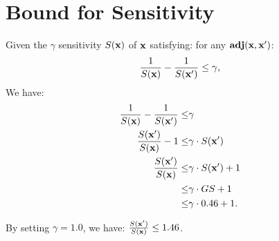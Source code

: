 \documentclass{article}
\begin{document}
\section{Bound for Sensitivity}
Given the $\gamma$ sensitivity $S(\textbf{x})$ of $\textbf{x}$ satisfying: for any $\textbf{adj}(\textbf{x},\textbf{x}')$:
\begin{equation}
\label{eq_gamma_smooth}
\frac{1}{S(\textbf{x})} - \frac{1}{S(\textbf{x}')} \leq \gamma,
\end{equation}
We have:
\begin{align*}
\frac{1}{S(\textbf{x})} - \frac{1}{S(\textbf{x}')} \leq & \gamma\\
\frac{S(\textbf{x}')}{S(\textbf{x})} - 1 \leq & \gamma \cdot S(\textbf{x}')\\
\frac{S(\textbf{x}')}{S(\textbf{x})} \leq & \gamma \cdot S(\textbf{x}') + 1\\
\leq & \gamma \cdot GS + 1 \\
\leq & \gamma \cdot 0.46 + 1.
\end{align*}

By setting $\gamma = 1.0$, we have: $\frac{S(\textbf{x}')}{S(\textbf{x})} \leq 1.46$.


  
\end{document}
